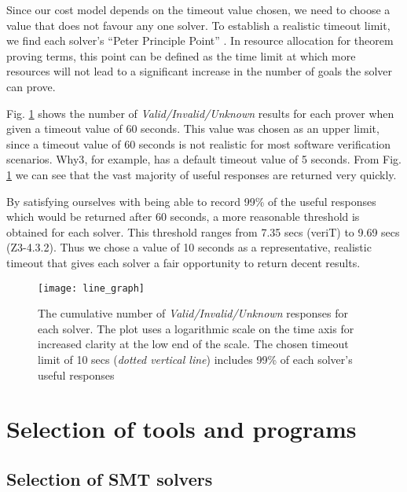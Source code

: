 Since our cost model depends on the timeout value chosen, we need to choose a value that does not favour any one solver.  To establish a realistic timeout limit, we find each solver's ``Peter Principle Point'' \cite{Sutcliffe200139}. In resource allocation for theorem proving terms, this point can be defined as the time limit at which more resources will not lead to a significant increase in the number of goals the solver can prove. 

Fig. \ref{fig:line_graph} shows the number of \textit{Valid/Invalid/Unknown} results for each prover when given a timeout value of 60 seconds. 
This value was chosen as an upper limit, since a timeout value of 60 seconds is not realistic for most software verification scenarios.  \textsf{Why3}, for example, has a default timeout value of 5 seconds. 
From Fig. \ref{fig:line_graph} we can see that the vast majority of useful responses are returned very quickly. 

By satisfying ourselves with being able to record 99\% of the useful responses which would be returned after 60 seconds, a more reasonable threshold is obtained for each solver. This threshold ranges from 7.35 secs (veriT) to 9.69 secs (Z3-4.3.2). Thus we chose a value of 10 seconds as a representative, realistic timeout that gives each solver a fair opportunity to return decent results.     

\begin{figure}
	\centering
	\texttt{[image: line\_graph]}
	\caption{The cumulative number of \textit{Valid/Invalid/Unknown} responses for each solver. The plot uses a logarithmic scale on the time axis for increased clarity at the low end of the scale. The chosen timeout limit of 10 secs (\textit{dotted vertical line}) includes 99\% of each solver's useful responses}
	\label{fig:line_graph}
\end{figure}





\section{Selection of tools and programs}
\subsection{Selection of \textsc{SMT} solvers}
